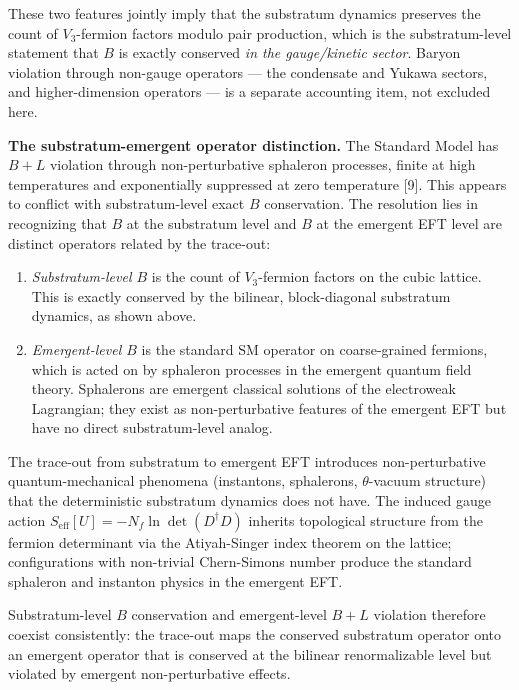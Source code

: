 \documentclass[
]{article}
\begin{document}
These two features jointly imply that the substratum dynamics preserves
the count of \(V_3\)-fermion factors modulo pair production, which is
the substratum-level statement that \(B\) is exactly conserved \emph{in
the gauge/kinetic sector}. Baryon violation through non-gauge operators
--- the condensate and Yukawa sectors, and higher-dimension operators
--- is a separate accounting item, not excluded here.

\textbf{The substratum-emergent operator distinction.} The Standard
Model has \(B + L\) violation through non-perturbative sphaleron
processes, finite at high temperatures and exponentially suppressed at
zero temperature {[}9{]}. This appears to conflict with substratum-level
exact \(B\) conservation. The resolution lies in recognizing that \(B\)
at the substratum level and \(B\) at the emergent EFT level are distinct
operators related by the trace-out:

\begin{enumerate}
\def\labelenumi{(\alph{enumi})}
\item
  \emph{Substratum-level \(B\)} is the count of \(V_3\)-fermion factors
  on the cubic lattice. This is exactly conserved by the bilinear,
  block-diagonal substratum dynamics, as shown above.
\item
  \emph{Emergent-level \(B\)} is the standard SM operator on
  coarse-grained fermions, which is acted on by sphaleron processes in
  the emergent quantum field theory. Sphalerons are emergent classical
  solutions of the electroweak Lagrangian; they exist as
  non-perturbative features of the emergent EFT but have no direct
  substratum-level analog.
\end{enumerate}

The trace-out from substratum to emergent EFT introduces
non-perturbative quantum-mechanical phenomena (instantons, sphalerons,
\(\theta\)-vacuum structure) that the deterministic substratum dynamics
does not have. The induced gauge action
\(S_{\mathrm{eff}}[U] = -N_f \ln \det(D^\dagger D)\) inherits
topological structure from the fermion determinant via the Atiyah-Singer
index theorem on the lattice; configurations with non-trivial
Chern-Simons number produce the standard sphaleron and instanton physics
in the emergent EFT.

Substratum-level \(B\) conservation and emergent-level \(B + L\)
violation therefore coexist consistently: the trace-out maps the
conserved substratum operator onto an emergent operator that is
conserved at the bilinear renormalizable level but violated by emergent
non-perturbative effects.
\end{document}

